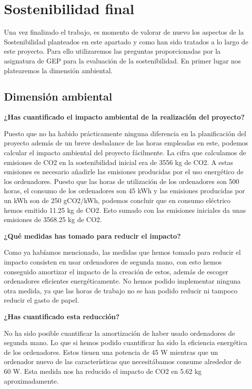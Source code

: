 \chapter{Sostenibilidad final}

Una vez finalizado el trabajo, es momento de valorar de nuevo los aspectos de la Sostenibilidad planteados en este apartado y como han sido tratados a lo largo de este proyecto. Para ello utilizaremos las preguntas proporcionadas por la asignatura de GEP para la evaluación de la sostenibilidad. En primer lugar nos platearemos la dimensión ambiental.

\section{Dimensión ambiental}

\textbf{¿Has cuantificado el impacto ambiental de la realización del proyecto?}

Puesto que no ha habido prácticamente ninguna diferencia en la planificación del proyecto además de un breve desbalance de las horas empleadas en este, podemos calcular el impacto ambiental del proyecto fácilmente. La cifra que calculamos de emisiones de CO2 en la sostenibilidad inicial era de 3556 kg de CO2. A estas emisiones es necesario añadirle las emisiones producidas por el uso energético de los ordenadores. Puesto que las horas de utilización de los ordenadores son 500 horas, el consumo de los ordenadores son 45 kWh y las emisiones producidas por un kWh son de 250 gCO2/kWh, podemos concluir que en consumo eléctrico hemos emitido 11.25 kg de CO2. Esto sumado con las emisiones iniciales da unas emisiones de 3568.25 kg de CO2.

\textbf{¿Qué medidas has tomado para reducir el impacto?}

Como ya habíamos mencionado, las medidas que hemos tomado para reducir el impacto consisten en usar ordenadores de segunda mano, con esto hemos conseguido amortizar el impacto de la creación de estos, además de escoger ordenadores eficientes energéticamente. No hemos podido implementar ninguna otra medida, ya que las horas de trabajo no se han podido reducir ni tampoco reducir el gasto de papel.

\textbf{¿Has cuantificado esta reducción?}

No ha sido posible cuantificar la amortización de haber usado ordenadores de segunda mano. Lo que si hemos podido cuantificar ha sido la eficiencia energética de los ordenadores. Estos tienen una potencia de 45 W mientras que un ordenador nuevo de las características que necesitábamos consume alrededor de 60 W. Esta medida nos ha reducido el impacto de CO2 en 5.62 kg aproximadamente.


